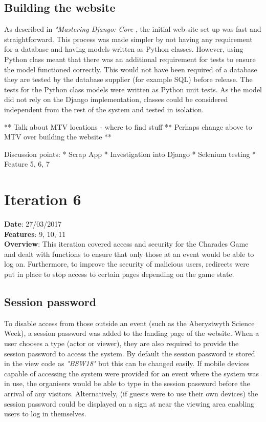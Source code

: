 \subsection{Building the website}
As described in \textit{"Mastering Django: Core} \cite{django_book}, the initial web site set up was fast and straightforward. This process was made simpler by not having any requirement for a database and having models written as Python classes. However, using Python class meant that there was an additional requirement for tests to ensure the model functioned correctly. This would not have been required of a database they are tested by the database supplier (for example SQL) before release. The tests for the Python class models were written as Python unit tests. As the model did not rely on the Django implementation, classes could be considered independent from the rest of the system and tested in isolation. 

** Talk about MTV locations - where to find stuff ** Perhaps change above to MTV over building the website **

Discussion points:
* Scrap App
* Investigation into Django
* Selenium testing
* Feature 5, 6, 7

\newpage

\section{Iteration 6}
\textbf{Date}: 27/03/2017 \\
\textbf{Features}: 9, 10, 11 \\
\textbf{Overview}: This iteration covered access and security for the Charades Game and dealt with functions to ensure that only those at an event would be able to log on. Furthermore, to improve the security of malicious users, redirects were put in place to stop access to certain pages depending on the game state.

\subsection{Session password}
To disable access from those outside an event (such as the Aberystwyth Science Week), a session password was added to the landing page of the website. When a user chooses a type (actor or viewer), they are also required to provide the session password to access the system. By default the session password is stored in the view code as \textit{"BSW18"} but this can be changed easily. If mobile devices capable of accessing the system were provided for an event where the system was in use, the organisers would be able to type in the session password before the arrival of any visitors. Alternatively, (if guests were to use their own devices) the session password could be displayed on a sign at near the viewing area enabling users to log in themselves.


